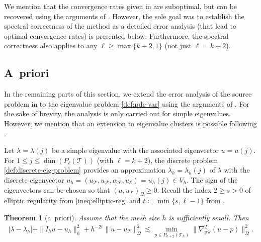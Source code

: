 \documentclass[a4paper]{amsart}
\numberwithin{equation}{section}
\def\F{\mathcal{F}}
\def\E{\mathcal{E}}
\def\T{\mathcal{T}}
\def\pw{\mathrm{pw}}
\newtheorem{theorem}{Theorem}[section]
\theoremstyle{definition}
\theoremstyle{remark}
\numberwithin{theorem}{section}
\numberwithin{equation}{section}
\numberwithin{table}{section}
\numberwithin{figure}{section}
\begin{document}
We mention that the convergence rates given in  are suboptimal, but can be recovered using the arguments of \cite{CaloCicuttinDengErn2019}. However, the sole goal was to establish the spectral correctness of the method as a detailed error analysis (that lead to optimal convergence rates) is presented below.
Furthermore, the spectral correctness also applies to any $\ell \geq \max\{k-2,1\}$ (not just $\ell = k+2$).

\subsection{A~priori}
In the remaining parts of this section, we extend the error analysis of the source problem in  to the eigenvalue problem \eqref{def:pde-var} using the arguments of \cite{CarstensenGallistlSchedensack2015,CarstensenGraessleTran2024}. For the sake of brevity, the analysis is only carried out for simple eigenvalues. However, we mention that an extension to eigenvalue clusters is possible following \cite{DaiHeZhou2015,Gallistl2015}. 

Let $\lambda = \lambda(j)$ be a simple eigenvalue with the associated eigenvector $u = u(j)$. For $1 \leq j \leq \dim(P_{\ell}(\T))$ (with $\ell = k+2$), the discrete problem \eqref{def:discrete-eig-problem} provides an approximation $\lambda_h = \lambda_h(j)$ of $\lambda$ with the discrete eigenvector $u_h = (u_\T, u_\F, \alpha_\F, u_\E) = u_h(j) \in V_h$.
The sign of the eigenvectors can be chosen so that $(u, u_\T)_\Omega \geq 0$.
Recall the index $2\geq s > 0$ of elliptic regularity from \eqref{ineq:elliptic-reg} and $t \coloneqq \min\{s,\ell-1\}$ from .

\begin{theorem}[a~priori]\label{thm:a-priori-eig}
	Assume that the mesh size $h$ is sufficiently small. Then
	\begin{align*}
		|\lambda - \lambda_h| + \|I_h u - u_h\|_{h}^2 + h^{-2t} \| u - u_\T\|_\Omega^2\lesssim \min_{p \in P_{k+2}(\mathcal{T}_h)}\|\nabla_\pw^2(u - p)\|_\Omega^2.
	\end{align*}
\end{theorem}
\end{document}
